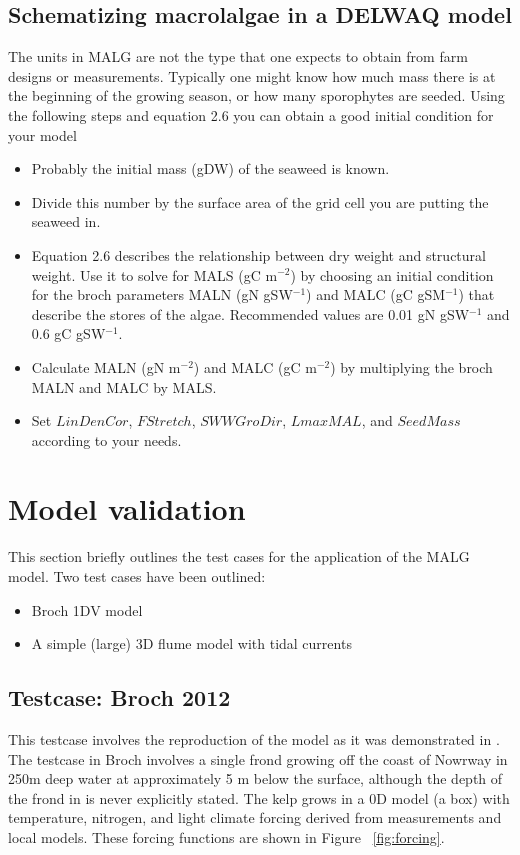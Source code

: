 \documentclass{deltares_manual}
\begin{document}
\section{Schematizing macrolalgae in a DELWAQ model}

The units in MALG are not the type that one expects to obtain from farm designs or measurements. Typically one might know how much mass there is at the beginning of the growing season, or how many sporophytes are seeded. Using the following steps and equation 2.6 you can obtain a good initial condition for your model\\
\begin{itemize}
	\item Probably the initial mass (gDW) of the seaweed is known.
	\item Divide this number by the surface area of the grid cell you are putting the seaweed in.
	\item Equation 2.6 describes the relationship between dry weight and structural weight. Use it to solve for MALS (gC m$^{-2}$) by choosing an initial condition for the broch parameters MALN (gN gSW$^{-1}$) and MALC (gC gSM$^{-1}$) that describe the stores of the algae. Recommended values are 0.01 gN gSW$^{-1}$ and 0.6 gC gSW$^{-1}$.
	\item Calculate MALN (gN m$^{-2}$) and MALC (gC m$^{-2}$) by multiplying the broch MALN and MALC by MALS.
	\item Set $LinDenCor$, $FStretch$, $SWWGroDir$, $LmaxMAL$, and $SeedMass$ according to your needs. 
\end{itemize}

\pagebreak

\chapter{Model validation}
This section briefly outlines the test cases for the application of the MALG model. Two test cases have been outlined:
\begin{itemize}
	\item Broch 1DV model
	\item A simple (large) 3D flume model with tidal currents
\end{itemize}
\section{Testcase: Broch 2012}
This testcase involves the reproduction of the model as it was demonstrated in \cite{broch2012}. The testcase in Broch involves a single frond growing off the coast of Nowrway in 250m deep water at approximately 5 m below the surface, although the depth of the frond in \cite{broch2012} is never explicitly stated. The kelp grows in a 0D model (a box) with temperature, nitrogen, and light climate forcing derived from measurements and local models. These forcing functions are shown in Figure ~\ref{fig:forcing}.
\end{document}
